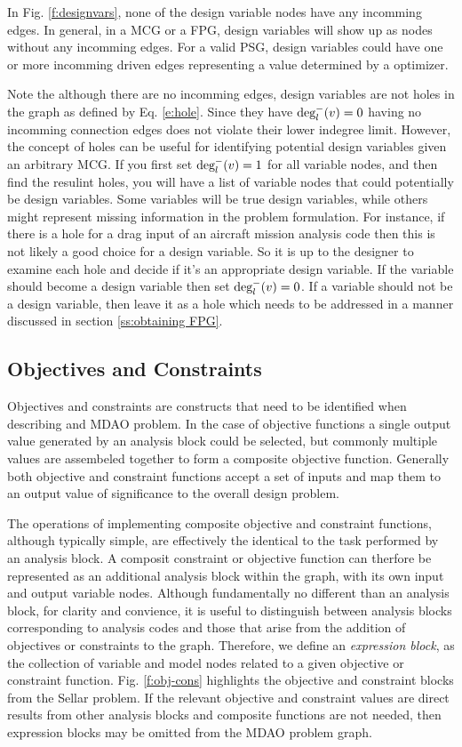 In Fig. \ref{f:designvars}, none of the design variable nodes have any incomming 
edges. In general, in a MCG or a FPG, design variables will 
show up as nodes without any incomming edges. For a valid PSG, design variables 
could have one or more incomming driven edges representing a value determined by 
a optimizer. 

Note the although there are no incomming edges, design variables are not holes 
in the graph as defined by Eq. \ref{e:hole}. Since they have $\textrm{deg}_l^-(v)=0$ 
having no incomming connection edges does not violate their lower indegree limit. 
However, the concept of holes can be useful for identifying potential design variables
given an arbitrary MCG. If you first set $\textrm{deg}_l^-(v)=1$ for all variable nodes, 
and then find the resulint holes, you will have a list of variable nodes that 
could potentially be design variables. Some variables will be true design variables, 
while others might represent missing information in the problem formulation. For 
instance, if there is a hole for a drag input of an aircraft mission analysis code 
then this is not likely a good choice for a design variable. So it is up to the designer to 
examine each hole and decide if it's an appropriate design variable. If 
the variable should become a design variable then set $\textrm{deg}_l^-(v)=0$. 
If a variable should not be a design variable, then leave it as a hole which 
needs to be addressed in a manner discussed in section \ref{ss:obtaining FPG}.
 

\subsection{Objectives and Constraints}
\label{ss:objectives and constraints}
Objectives and constraints are constructs that need to be identified when 
describing and MDAO problem. In the case of objective functions a single output 
value generated by an analysis block could be selected, but commonly multiple 
values are assembeled together to form a composite objective function. 
Generally both objective and constraint functions accept a set of inputs and map 
them to an output value of significance to the overall design problem. 

The operations of implementing composite objective and constraint functions, 
although typically simple, are effectively the identical to the task performed by an 
analysis block. A composit constraint or objective function can therfore 
be represented as an additional analysis block within the graph, with its own input and 
output variable nodes. Although fundamentally no different than an analysis block, 
for clarity and convience, it is useful to distinguish between analysis 
blocks corresponding to analysis codes and those that arise from the addition of 
objectives or constraints to the graph. Therefore, we define an 
\emph{expression block}, as the collection of variable and model nodes related 
to a given objective or constraint function. Fig. \ref{f:obj-cons} highlights 
the objective and constraint blocks from the Sellar problem. If the relevant 
objective and constraint values are direct results from other analysis blocks 
and composite functions are not needed, then expression blocks may be omitted 
from the MDAO problem graph.

